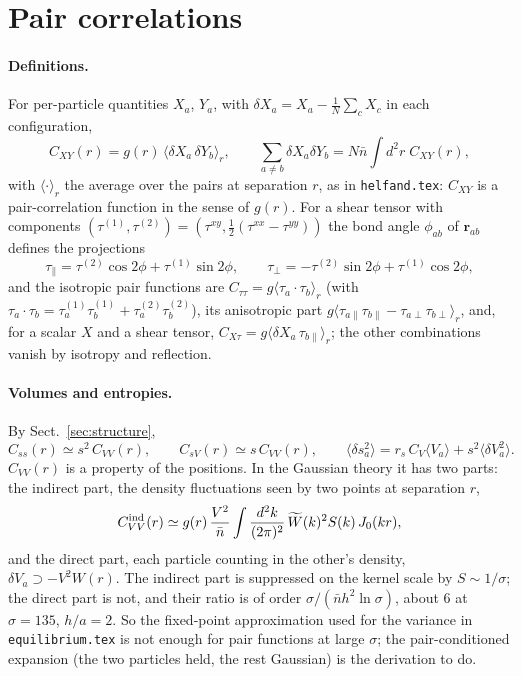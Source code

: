 \documentclass[11pt,aps,preprint,nofootinbib,superscriptaddress,tightenlines]{revtex4-2}
\newcommand{\avg}[1]{\langle #1\rangle}
\def\st{\begin{equation}}
\def\stp{\end{equation}}
\def\Sect#1{Sect.~\ref{#1}}
\let\oldparagraph\paragraph
\renewcommand{\paragraph}{\par\bigskip\oldparagraph}
\begin{document}
\section{Pair correlations}
\label{sec:pairs}

\paragraph{Definitions.}  For per-particle quantities $X_a$, $Y_a$, with $\delta X_a=X_a-\frac1N\sum_cX_c$ in each configuration,
\st
C_{XY}(r)=g(r)\,\avg{\delta X_a\,\delta Y_b}_r,\qquad \sum_{a\neq b}\delta X_a\delta Y_b=N\bar n\int d^2r\;C_{XY}(r),
\label{Cdef}
\stp
with $\avg{\cdot}_r$ the average over the pairs at separation $r$, as in \texttt{helfand.tex}: $C_{XY}$ is a pair-correlation function in the
sense of $g(r)$.  For a shear tensor with components $(\tau^{(1)},\tau^{(2)})=(\tau^{xy},\tfrac12(\tau^{xx}-\tau^{yy}))$ the bond angle $\phi_{ab}$ of
$\bm r_{ab}$ defines the projections
\st
\tau_\parallel=\tau^{(2)}\cos2\phi+\tau^{(1)}\sin2\phi,\qquad \tau_\perp=-\tau^{(2)}\sin2\phi+\tau^{(1)}\cos2\phi ,
\stp
and the isotropic pair functions are $C_{\tau\tau}=g\avg{\tau_a\cdot\tau_b}_r$ (with $\tau_a\cdot\tau_b=\tau_a^{(1)}\tau_b^{(1)}+\tau_a^{(2)}\tau_b^{(2)}$), its anisotropic
part $g\avg{\tau_{a\parallel}\tau_{b\parallel}-\tau_{a\perp}\tau_{b\perp}}_r$, and, for a scalar $X$ and a shear tensor, $C_{X\tau}=g\avg{\delta X_a\,\tau_{b\parallel}}_r$; the other
combinations vanish by isotropy and reflection.

\paragraph{Volumes and entropies.}  By \Sect{sec:structure},
\st
C_{ss}(r)\simeq s^2\,C_{VV}(r),\qquad C_{sV}(r)\simeq s\,C_{VV}(r),\qquad
\avg{\delta s_a^2}=r_s\,C_V\avg{V_a}+s^2\avg{\delta V_a^2} .
\stp
$C_{VV}(r)$ is a property of the positions.  In the Gaussian theory it has two parts: the indirect part, the density fluctuations seen by two
points at separation $r$,
\st
C_{VV}^{\rm ind}(r)\simeq g(r)\,\frac{V^2}{\bar n}\int\frac{d^2k}{(2\pi)^2}\,\widetilde W(k)^2S(k)\,J_0(kr),
\stp
and the direct part, each particle counting in the other's density, $\delta V_a\supset-V^2W(r)$.  The indirect part is suppressed on the kernel
scale by $S\sim1/\sigma$; the direct part is not, and their ratio is of order $\sigma/(\bar nh^2\ln\sigma)$, about $6$ at $\sigma=135$, $h/a=2$.  So the
fixed-point approximation used for the variance in \texttt{equilibrium.tex} is not enough for pair functions at large $\sigma$; the pair-conditioned
expansion (the two particles held, the rest Gaussian) is the derivation to do.
\end{document}
